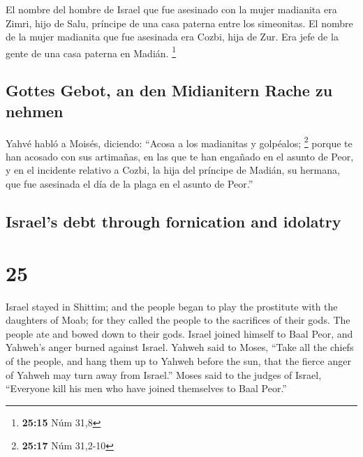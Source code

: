 \begin{paracol}{2}
 El nombre del hombre de Israel que fue asesinado con la
mujer madianita era Zimri, hijo de Salu, príncipe de una casa paterna
entre los simeonitas.  El nombre de la mujer madianita
que fue asesinada era Cozbi, hija de Zur. Era jefe de la gente de una
casa paterna en Madián. \footnote{\textbf{25:15} Núm 31,8}

\hypertarget{gottes-gebot-an-den-midianitern-rache-zu-nehmen}{%
\subsection{Gottes Gebot, an den Midianitern Rache zu
nehmen}\label{gottes-gebot-an-den-midianitern-rache-zu-nehmen}}

 Yahvé habló a Moisés, diciendo:  ``Acosa
a los madianitas y golpéalos; \footnote{\textbf{25:17} Núm 31,2-10}
 porque te han acosado con sus artimañas, en las que te
han engañado en el asunto de Peor, y en el incidente relativo a Cozbi,
la hija del príncipe de Madián, su hermana, que fue asesinada el día de
la plaga en el asunto de Peor.''

\switchcolumn
\begin{otherlanguage}{english}

\hypertarget{israels-debt-through-fornication-and-idolatry}{%
\subsection{Israel's debt through fornication and
idolatry}\label{israels-debt-through-fornication-and-idolatry}}

\hypertarget{section-49}{%
\section{25}\label{section-49}}

 Israel stayed in Shittim; and the people began to play
the prostitute with the daughters of Moab;  for they
called the people to the sacrifices of their gods. The people ate and
bowed down to their gods.  Israel joined himself to Baal
Peor, and Yahweh's anger burned against Israel.  Yahweh
said to Moses, ``Take all the chiefs of the people, and hang them up to
Yahweh before the sun, that the fierce anger of Yahweh may turn away
from Israel.''  Moses said to the judges of Israel,
``Everyone kill his men who have joined themselves to Baal Peor.''


\end{otherlanguage}
\end{paracol}

